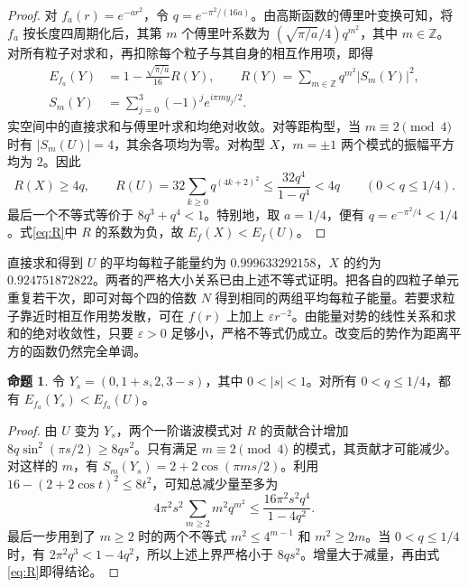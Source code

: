 \documentclass[11pt]{article}
\theoremstyle{definition}
\newtheorem{proposition}[theorem]{命题}
\newcommand{\Z}{\mathbb Z}
\begin{document}
\begin{proof}
对 $f_a(r)=e^{-ar^2}$，令 $q=e^{-\pi^2/(16a)}$。由高斯函数的傅里叶变换可知，将 $f_a$ 按长度四周期化后，其第 $m$ 个傅里叶系数为 $(\sqrt{\pi/a}/4)q^{m^2}$，其中 $m\in\Z$。对所有粒子对求和，再扣除每个粒子与其自身的相互作用项，即得
\begin{align}
 E_{f_a}(Y)&=1-\frac{\sqrt{\pi/a}}{16}R(Y),\qquad
 R(Y)=\sum_{m\in\Z}q^{m^2}|S_m(Y)|^2,\label{eq:R}\\
 S_m(Y)&=\sum_{j=0}^3(-1)^j e^{i\pi m y_j/2}.\nonumber
\end{align}
实空间中的直接求和与傅里叶求和均绝对收敛。对等距构型，当 $m\equiv2\pmod4$ 时有 $|S_m(U)|=4$，其余各项均为零。对构型 $X$，$m=\pm1$ 两个模式的振幅平方均为 $2$。因此
\[
 R(X)\ge4q,\qquad R(U)=32\sum_{k\ge0}q^{(4k+2)^2}
          \le\frac{32q^4}{1-q^4}<4q\qquad(0<q\le1/4).
\]
最后一个不等式等价于 $8q^3+q^4<1$。特别地，取 $a=1/4$，便有 $q=e^{-\pi^2/4}<1/4$。式\eqref{eq:R}中 $R$ 的系数为负，故 $E_f(X)<E_f(U)$。
\end{proof}

直接求和得到 $U$ 的平均每粒子能量约为 $0.999633292158$，$X$ 的约为 $0.924751872822$。两者的严格大小关系已由上述不等式证明。把各自的四粒子单元重复若干次，即可对每个四的倍数 $N$ 得到相同的两组平均每粒子能量。若要求粒子靠近时相互作用势发散，可在 $f(r)$ 上加上 $\varepsilon r^{-2}$。由能量对势的线性关系和求和的绝对收敛性，只要 $\varepsilon>0$ 足够小，严格不等式仍成立。改变后的势作为距离平方的函数仍然完全单调。

\begin{proposition}\label{prop:instability}
令 $Y_s=(0,1+s,2,3-s)$，其中 $0<|s|<1$。对所有 $0<q\le1/4$，都有 $E_{f_a}(Y_s)<E_{f_a}(U)$。
\end{proposition}
\begin{proof}
由 $U$ 变为 $Y_s$，两个一阶谐波模式对 $R$ 的贡献合计增加 $8q\sin^2(\pi s/2)\ge8q s^2$。只有满足 $m\equiv2\pmod4$ 的模式，其贡献才可能减少。对这样的 $m$，有 $S_m(Y_s)=2+2\cos(\pi ms/2)$。利用 $16-(2+2\cos t)^2\le8t^2$，可知总减少量至多为
\[
  4\pi^2 s^2\sum_{m\ge2}m^2q^{m^2}
  \le \frac{16\pi^2 s^2q^4}{1-4q^2}.
\]
最后一步用到了 $m\ge2$ 时的两个不等式 $m^2\le4^{m-1}$ 和 $m^2\ge2m$。当 $0<q\le1/4$ 时，有 $2\pi^2q^3<1-4q^2$，所以上述上界严格小于 $8qs^2$。增量大于减量，再由式\eqref{eq:R}即得结论。
\end{proof}

\newpage
\end{document}
